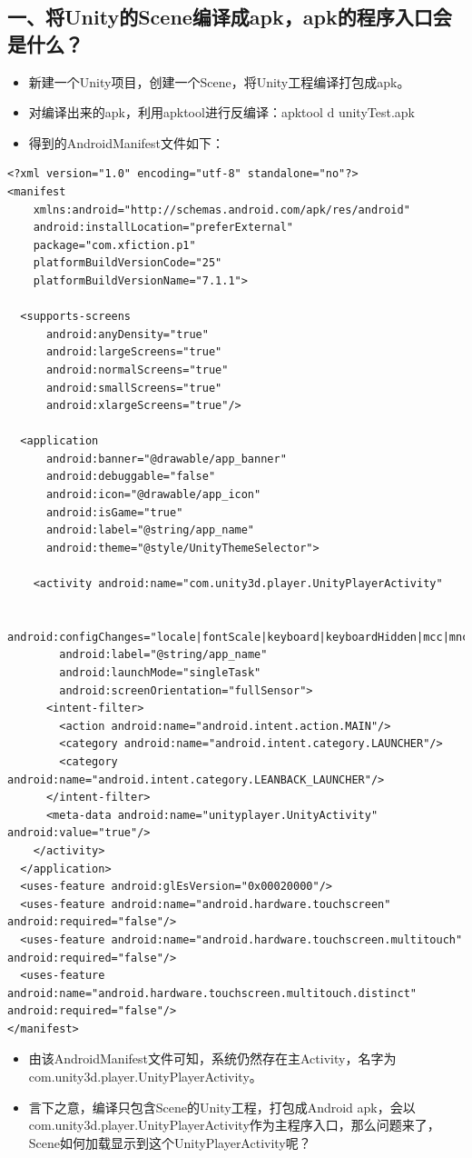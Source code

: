 \documentclass[9pt, b5paper]{article}
\begin{document}
\subsection{一、将Unity的Scene编译成apk，apk的程序入口会是什么？}
\label{sec-1-1}
\begin{itemize}
\item 新建一个Unity项目，创建一个Scene，将Unity工程编译打包成apk。
\item 对编译出来的apk，利用apktool进行反编译：apktool d unityTest.apk
\item 得到的AndroidManifest文件如下：
\end{itemize}
\begin{verbatim}
<?xml version="1.0" encoding="utf-8" standalone="no"?>
<manifest
    xmlns:android="http://schemas.android.com/apk/res/android"
    android:installLocation="preferExternal"
    package="com.xfiction.p1"
    platformBuildVersionCode="25"
    platformBuildVersionName="7.1.1">

  <supports-screens
      android:anyDensity="true"
      android:largeScreens="true"
      android:normalScreens="true"
      android:smallScreens="true"
      android:xlargeScreens="true"/>

  <application
      android:banner="@drawable/app_banner"
      android:debuggable="false"
      android:icon="@drawable/app_icon"
      android:isGame="true"
      android:label="@string/app_name"
      android:theme="@style/UnityThemeSelector">

    <activity android:name="com.unity3d.player.UnityPlayerActivity" 

        android:configChanges="locale|fontScale|keyboard|keyboardHidden|mcc|mnc|navigation|orientation|screenLayout|screenSize|smallestScreenSize|touchscreen|uiMode"
        android:label="@string/app_name"
        android:launchMode="singleTask"
        android:screenOrientation="fullSensor">
      <intent-filter>
        <action android:name="android.intent.action.MAIN"/>
        <category android:name="android.intent.category.LAUNCHER"/>
        <category android:name="android.intent.category.LEANBACK_LAUNCHER"/>
      </intent-filter>
      <meta-data android:name="unityplayer.UnityActivity" android:value="true"/>
    </activity>
  </application>
  <uses-feature android:glEsVersion="0x00020000"/>
  <uses-feature android:name="android.hardware.touchscreen" android:required="false"/>
  <uses-feature android:name="android.hardware.touchscreen.multitouch" android:required="false"/>
  <uses-feature android:name="android.hardware.touchscreen.multitouch.distinct" android:required="false"/>
</manifest>
\end{verbatim}
\begin{itemize}
\item 由该AndroidManifest文件可知，系统仍然存在主Activity，名字为com.unity3d.player.UnityPlayerActivity。
\item 言下之意，编译只包含Scene的Unity工程，打包成Android apk，会以com.unity3d.player.UnityPlayerActivity作为主程序入口，那么问题来了，Scene如何加载显示到这个UnityPlayerActivity呢？
\end{itemize}
\end{document}
